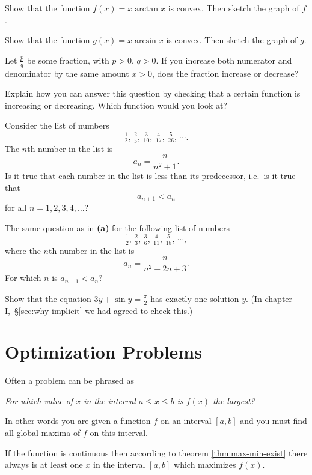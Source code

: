 \begin{multicols}{2}
\subprob Show that the function $f(x) = x\arctan x$ is convex.  Then
sketch the graph of $f$.

\subprob Show that the function $g(x) = x\arcsin x$ is convex.  Then
sketch the graph of $g$.

\problem  Let $\frac pq$ be some fraction, with $p>0$, $q>0$.
If you increase both numerator and denominator by the same amount
$x>0$, does the fraction increase or decrease?

Explain how you can answer this question by checking that a certain
function is increasing or decreasing.  Which function would you look
at?

\problem\subprob Consider the list of numbers
\[
\tfrac{1} {2},\,
\tfrac{2} {5},\,
\tfrac{3} {10},\,
\tfrac{4} {17},\,
\tfrac{5} {26},\,
\cdots.
\]
The $n$th number in the list is
\[
a_n = \frac{n} {n^2+1}.
\]
Is it true that each number in the list is less than its predecessor,
i.e.~is it true that
\[
a_{n+1} < a_n
\]
for all $n=1, 2, 3, 4, \ldots$?

\subprob The same question as in \textbf{(a)}
for the following list of numbers
\[
\tfrac{1} {2},\,
\tfrac{2} {3},\,
\tfrac{3} {6},\,
\tfrac{4} {11},\,
\tfrac{5} {18},\,
\cdots,
\]
where the $n$th number in the list is
\[
a_n = \frac{n} {n^2-2n+3}.
\]
For which $n$ is $a_{n+1} < a_n$?

\problem  \label{ex:implicit-from-ch1}
Show that the equation $3y+\sin y = \frac\pi2$ has exactly
one solution $y$.  (In chapter I,~\S\ref{sec:why-implicit} we had agreed to
check this.)

\end{multicols}
\noproblemfont

\section{Optimization Problems}
Often a problem can be phrased as
\begin{center}
  \textit{For which value of $x$ in the interval $a\leq x\leq b$ is $f(x)$ the
    largest?}
\end{center}
In other words you are given a function $f$ on an interval $[a, b]$ and you must
find all global maxima of $f$ on this interval.

If the function is continuous then according to theorem \ref{thm:max-min-exist}
there always is at least one $x$ in the interval $[a,b]$ which maximizes $f(x)$.

